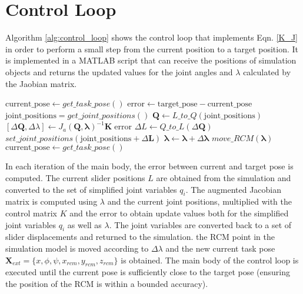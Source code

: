 \section{Control Loop}\label{control}

Algorithm \ref{alg:control_loop} shows the control loop that implements Eqn. \ref{K_J} in order to perform a small step from the current position to a target position. It is implemented in a MATLAB script that can receive the positions of simulation objects and returns the updated values for the joint angles and $\lambda$ calculated by the Jaobian matrix.

\begin{algorithm}
  \begin{algorithmic}[1]
 \STATE $\text{current\_pose} \leftarrow \textit{get\_task\_pose}()$
  \STATE $\text{error} \leftarrow \text{target\_pose}-\text{current\_pose}$
  \STATE $\text{joint\_positions}=\textit{get\_joint\_positions}()$
  \STATE $\bm{Q} \leftarrow \textit{L\_to\_Q}(\text{joint\_positions})$
  \STATE $[\Delta \bm{Q},\Delta\lambda] \leftarrow J_a(\bm{Q},\bm{\lambda})^{-1}\bm{K} \; \text{error}$
  \STATE $\Delta L \leftarrow \textit{Q\_to\_L}(\Delta \bm{Q})$
  \STATE $\textit{set\_joint\_positions}(\text{joint\_positions}+\Delta \bm{L})$
  \STATE $\bm{\lambda} \leftarrow \bm{\lambda} + \Delta\bm{\lambda}$
  \STATE $\textit{move\_RCM}(\bm{\lambda})$
  \STATE $\text{current\_pose} \leftarrow \textit{get\_task\_pose}()$
 \ENDWHILE 
  \end{algorithmic}
  \caption{$\text{Control\_Loop}(\bm{K}, \text{target\_pose},J_a,\lambda)$} \label{alg:control_loop}
\end{algorithm}

In each iteration of the main body, the error between current and target pose is computed. The current slider positions $L$ are obtained from the simulation and converted to the set of simplified joint variables $q_i$. The augmented Jacobian matrix is computed using $\lambda$ and the current joint positions, multiplied with the control matrix $K$ and the error to obtain update values both for the simplified joint variables $q_i$ as well as $\lambda$. The joint variables are converted back to a set of slider displacements and returned to the simulation. the RCM point in the simulation model is moved according to $\Delta\lambda$ and the new current task pose $\bm{X}_{ext} = \{x, \phi, \psi, x_{rcm}, y_{rcm}, z_{rcm}\}$ is obtained. The main body of the control loop is executed until the current pose is sufficiently close to the target pose (ensuring the position of the RCM is within a bounded accuracy).

